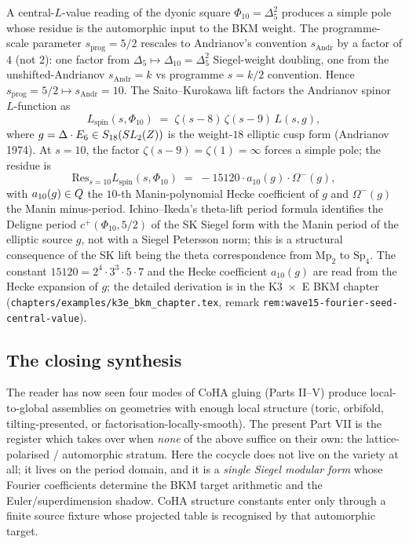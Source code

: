A central-$L$-value reading of the dyonic square $\Phi_{10} = \Delta_5^2$ produces a simple pole whose residue is the automorphic input to the BKM weight. The programme-scale parameter $s_{\mathrm{prog}} = 5/2$ rescales to Andrianov's convention $s_{\mathrm{Andr}}$ by a factor of $4$ (not $2$): one factor from $\Delta_5 \mapsto \Delta_{10} = \Delta_5^2$ Siegel-weight doubling, one from the unshifted-Andrianov $s_{\mathrm{Andr}} = k$ vs programme $s = k/2$ convention. Hence $s_{\mathrm{prog}} = 5/2 \mapsto s_{\mathrm{Andr}} = 10$. The Saito--Kurokawa lift factors the Andrianov spinor $L$-function as
\[
  L_{\mathrm{spin}}(s, \Phi_{10}) \;=\; \zeta(s - 8) \, \zeta(s - 9) \, L(s, g),
\]
where $g = \Delta \cdot E_6 \in S_{18}(SL_2(Z))$ is the weight-$18$ elliptic cusp form (Andrianov 1974). At $s = 10$, the factor $\zeta(s - 9) = \zeta(1) = \infty$ forces a simple pole; the residue is
\begin{equation}
  \mathrm{Res}_{s = 10} L_{\mathrm{spin}}(s, \Phi_{10}) \;=\; -15120 \cdot a_{10}(g) \cdot \Omega^-(g),
  \label{eq:saito-kurokawa-residue}
\end{equation}
with $a_{10}(g) \in Q$ the $10$-th Manin-polynomial Hecke coefficient of $g$ and $\Omega^-(g)$ the Manin minus-period. Ichino--Ikeda's theta-lift period formula identifies the Deligne period $c^+(\Phi_{10}, 5/2)$ of the SK Siegel form with the Manin period of the elliptic source $g$, not with a Siegel Petersson norm; this is a structural consequence of the SK lift being the theta correspondence from $\mathrm{Mp}_2$ to $\mathrm{Sp}_4$. The constant $15120 = 2^4 \cdot 3^3 \cdot 5 \cdot 7$ and the Hecke coefficient $a_{10}(g)$ are read from the Hecke expansion of $g$; the detailed derivation is in the K3~$\times$~E BKM chapter (\texttt{chapters/examples/k3e\_bkm\_chapter.tex}, remark \texttt{rem:wave15-fourier-seed-central-value}).

\subsection{The closing synthesis}

The reader has now seen four modes of CoHA gluing (Parts II--V) produce local-to-global assemblies on geometries with enough local structure (toric, orbifold, tilting-presented, or factorisation-locally-smooth). The present Part VII is the register which takes over when \emph{none} of the above suffice on their own: the lattice-polarised / automorphic stratum. Here the cocycle does not live on the variety at all; it lives on the period domain, and it is a \emph{single Siegel modular form} whose Fourier coefficients determine the BKM target arithmetic and the Euler/superdimension shadow. CoHA structure constants enter only through a finite source fixture whose projected table is recognised by that automorphic target.


